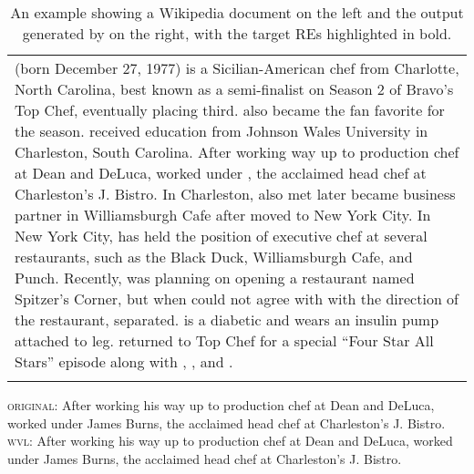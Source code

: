 \begin{table}
\begin{tabularx}{\textwidth}{ Q }
			 (born December 27, 1977) is a Sicilian-American chef from Charlotte, North Carolina, best known as a semi-finalist on Season 2 of Bravo's Top Chef, eventually placing third.  also became the fan favorite for the season. \italunder{-} received  education from Johnson Wales University in Charleston, South Carolina. After working  way up to production chef at Dean and DeLuca, \italunder{-} worked under , the acclaimed head chef at Charleston’s J. Bistro. In Charleston,  also met   later became  business partner in Williamsburgh Cafe after  moved to New York City. In New York City, \italunder{-} has held the position of executive chef at several restaurants, such as the Black Duck, Williamsburgh Cafe, and Punch. Recently,  was planning on opening a restaurant named Spitzer's Corner, but when \italunder{-} could not agree with  with the direction of the restaurant,  separated.  is a diabetic and \italunder{-} wears an insulin pump attached to  leg.  returned to Top Chef for a special “Four Star All Stars” episode along with , , and .
			\\ 
			\lspbottomrule
	\end{tabularx}
	\caption[A Wikipedia document (left) and the output of  (right).]{An example showing a Wikipedia document on the left and the output generated by  on the right, with the target REs highlighted in bold.}\label{tab:talbot}
\end{table}


\begin{exe}
	\ex \begin{xlist}
		\ex\label{ex:wlvorig} \textsc{original:} After working his way up to production chef at Dean and DeLuca,  worked under James Burns, the acclaimed head chef at Charleston’s J. Bistro.
		\ex\label{ex:wlv} \textsc{wvl:} After working his way up to production chef at Dean and DeLuca, \fbox{-} worked under James Burns, the acclaimed head chef at Charleston’s J. Bistro.
	\end{xlist}
\end{exe}

